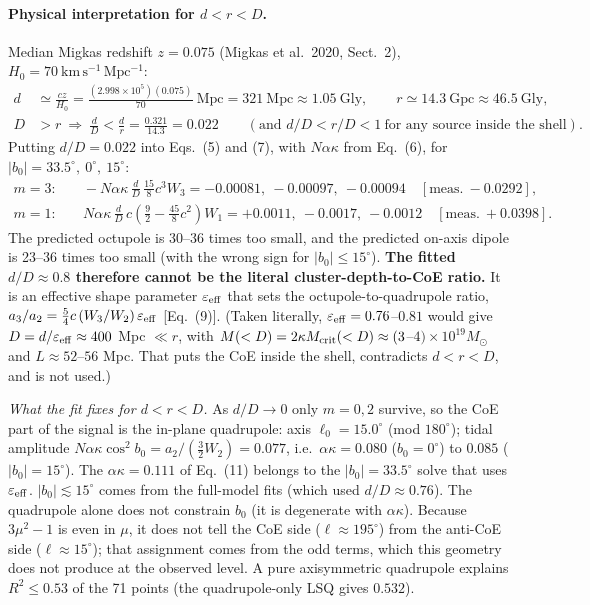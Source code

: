 \documentclass[11pt]{article}
\begin{document}
\paragraph{Physical interpretation for $d<r<D$.}
Median Migkas redshift $z=0.075$ (Migkas et al.\ 2020, Sect.~2), $H_0=70\ \mathrm{km\,s^{-1}\,Mpc^{-1}}$:
\begin{align}
d &\simeq \frac{cz}{H_0}=\frac{(2.998\times10^5)(0.075)}{70}\ \mathrm{Mpc}= 321\ \mathrm{Mpc}\approx 1.05\ \mathrm{Gly},\qquad
r\simeq14.3\ \mathrm{Gpc}\approx46.5\ \mathrm{Gly},\\
D&>r\ \Rightarrow\ \frac{d}{D}<\frac{d}{r}=\frac{0.321}{14.3}=0.022\qquad(\text{and } d/D<r/D<1\ \text{for any source inside the shell}).
\end{align}
Putting $d/D=0.022$ into Eqs.~(5) and (7), with $N\alpha\kappa$ from Eq.~(6), for $|b_0|=33.5^\circ,\ 0^\circ,\ 15^\circ$:
\begin{align}
m=3:&\quad -N\alpha\kappa\,\tfrac{d}{D}\,\tfrac{15}{8}c^3W_3=-0.00081,\ -0.00097,\ -0.00094\quad[\text{meas.}\ -0.0292],\\
m=1:&\quad N\alpha\kappa\,\tfrac{d}{D}\,c\left(\tfrac92-\tfrac{45}{8}c^2\right)W_1=+0.0011,\ -0.0017,\ -0.0012\quad[\text{meas.}\ +0.0398] .
\end{align}
The predicted octupole is 30--36 times too small, and the predicted on-axis dipole is 23--36 times too small (with the wrong sign for $|b_0|\le15^\circ$).
\textbf{The fitted $d/D\approx0.8$ therefore cannot be the literal cluster-depth-to-CoE ratio.} It is an effective shape parameter
$\varepsilon_{\rm eff}$ that sets the octupole-to-quadrupole ratio, $a_3/a_2=\tfrac54c\,(W_3/W_2)\,\varepsilon_{\rm eff}$ [Eq.~(9)].
(Taken literally, $\varepsilon_{\rm eff}=0.76$--$0.81$ would give $D=d/\varepsilon_{\rm eff}\approx400$ Mpc $\ll r$, with $M(<D)=2\kappa M_{\rm crit}(<D)\approx(3$--$4)\times10^{19}M_\odot$ and $L\approx52$--$56$ Mpc. That puts the CoE inside the shell, contradicts $d<r<D$, and is not used.)

\emph{What the fit fixes for $d<r<D$.} As $d/D\to0$ only $m=0,2$ survive, so the CoE part of the signal is the in-plane quadrupole:
axis $\ell_0=15.0^\circ$ (mod $180^\circ$); tidal amplitude $N\alpha\kappa\cos^2b_0=a_2/(\tfrac32W_2)=0.077$, i.e.\ $\alpha\kappa=0.080$ ($b_0=0^\circ$) to $0.085$ ($|b_0|=15^\circ$).
The $\alpha\kappa=0.111$ of Eq.~(11) belongs to the $|b_0|=33.5^\circ$ solve that uses $\varepsilon_{\rm eff}$.
$|b_0|\lesssim15^\circ$ comes from the full-model fits (which used $d/D\approx0.76$). The quadrupole alone does not constrain $b_0$ (it is degenerate with $\alpha\kappa$).
Because $3\mu^2-1$ is even in $\mu$, it does not tell the CoE side ($\ell\approx195^\circ$) from the anti-CoE side ($\ell\approx15^\circ$); that assignment comes from the odd terms, which this geometry does not produce at the observed level.
A pure axisymmetric quadrupole explains $R^2\le0.53$ of the 71 points (the quadrupole-only LSQ gives $0.532$).
\end{document}
